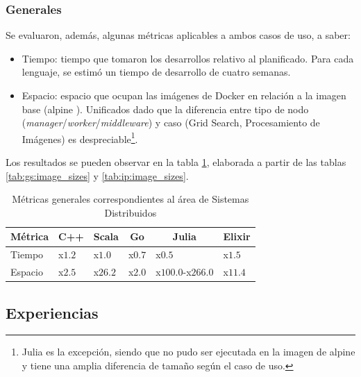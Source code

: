 \documentclass[11pt]{article}
\let\Oldsubsection\subsection
\renewcommand{\subsection}{\FloatBarrier\Oldsubsection}
\let\Oldsubsubsection\subsubsection
\renewcommand{\subsubsection}{\FloatBarrier\Oldsubsubsection}
\newcommand{\english}[1]{\textit{#1}}
\begin{document}
\subsubsection{Generales} \label{sec:general_metrics}

Se evaluaron, además, algunas métricas aplicables a ambos casos de uso, a saber:

\begin{itemize}
    \item Tiempo: tiempo que tomaron los desarrollos relativo al planificado. Para cada lenguaje, se estimó un tiempo de desarrollo de cuatro semanas.
    \item Espacio: espacio que ocupan las imágenes de Docker en relación a la imagen base (alpine \cite{metrics:apline}). Unificados dado que la diferencia entre tipo de nodo (\english{manager}/\english{worker}/\english{middleware}) y caso (Grid Search, Procesamiento de Imágenes) es despreciable\footnote{Julia es la excepción, siendo que no pudo ser ejecutada en la imagen de alpine y tiene una amplia diferencia de tamaño según el caso de uso.}.
\end{itemize}

Los resultados se pueden observar en la tabla \ref{tab:sis_dist:general_metrics}, elaborada a partir de las tablas \ref{tab:gs:image_sizes} y \ref{tab:ip:image_sizes}.

\begin{table}
\centering
\begin{tabular}{|l|l|l|l|l|l|}
\hline
\multicolumn{1}{|c|}{Métrica} & \multicolumn{1}{c|}{C++} & \multicolumn{1}{c|}{Scala} & \multicolumn{1}{c|}{Go} & \multicolumn{1}{c|}{Julia} & \multicolumn{1}{c|}{Elixir} \\ \hline
Tiempo                        & x$1.2$                    & x$1.0$                      & x$0.7$                    & x$0.5$                       & x$1.5$                       \\ \hline
Espacio                       & x$2.5$                     & x$26.2$                      & x$2.0$                      & x$100.0$-x$266.0$                  & x$11.4$                       \\ \hline
\end{tabular}
\caption{Métricas generales correspondientes al área de Sistemas Distribuidos}
\label{tab:sis_dist:general_metrics}
\end{table}

\subsection{Experiencias}
\end{document}
